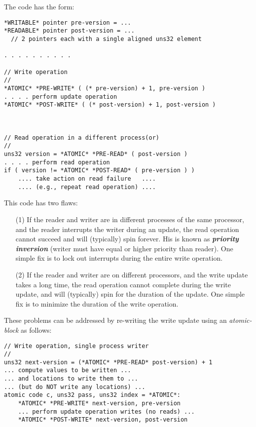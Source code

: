 \documentclass[12pt]{article}
\newcommand{\key}[1]{{\bf \em #1}\index{#1}}
\newenvironment{indpar}[1][0.3in]%
	{\begin{list}{}%
		     {\setlength{\itemsep}{0in}%
		      \setlength{\topsep}{0in}%
		      \setlength{\parsep}{1ex}%
		      \setlength{\labelwidth}{#1}%
		      \setlength{\leftmargin}{#1}%
		      \addtolength{\leftmargin}{\labelsep}}%
	 \item}%
	{\end{list}}
\begin{document}
The code has the form:
\begin{indpar}\begin{verbatim}
*WRITABLE* pointer pre-version = ...
*READABLE* pointer post-version = ...
  // 2 pointers each with a single aligned uns32 element

. . . . . . . . . .

// Write operation
//
*ATOMIC* *PRE-WRITE* ( (* pre-version) + 1, pre-version )
. . . . perform update operation
*ATOMIC* *POST-WRITE* ( (* post-version) + 1, post-version )



// Read operation in a different process(or)
//
uns32 version = *ATOMIC* *PRE-READ* ( post-version )
. . . . perform read operation
if ( version != *ATOMIC* *POST-READ* ( pre-version ) )
    .... take action on read failure   ....
    .... (e.g., repeat read operation) ....
\end{verbatim}\end{indpar}

This code has two flaws:
\begin{itemize}
\item[(1)] If the reader and writer are in different
processes of the same processor, and the reader interrupts the writer
during an update, the read operation cannot succeed and will (typically)
spin forever.  His is known as \key{priority inversion} (writer must
have equal or higher priority than reader).  One simple fix is to lock
out interrupts during the entire write operation.

\item[(2)] If the reader and writer are on different processors, and
the write update takes a long time, the read operation cannot complete
during the write update, and will (typically) spin for the duration
of the update.  One simple fix is to minimize the duration of the
write operation.
\end{itemize}

These problems can be addressed by re-writing the write update
using an {\em atomic-block} as follows:
\begin{indpar}\begin{verbatim}
// Write operation, single process writer
//
uns32 next-version = (*ATOMIC* *PRE-READ* post-version) + 1
... compute values to be written ...
... and locations to write them to ...
... (but do NOT write any locations) ...
atomic code c, uns32 pass, uns32 index = *ATOMIC*:
    *ATOMIC* *PRE-WRITE* next-version, pre-version
    ... perform update operation writes (no reads) ...
    *ATOMIC* *POST-WRITE* next-version, post-version
\end{verbatim}\end{indpar}
\end{document}
